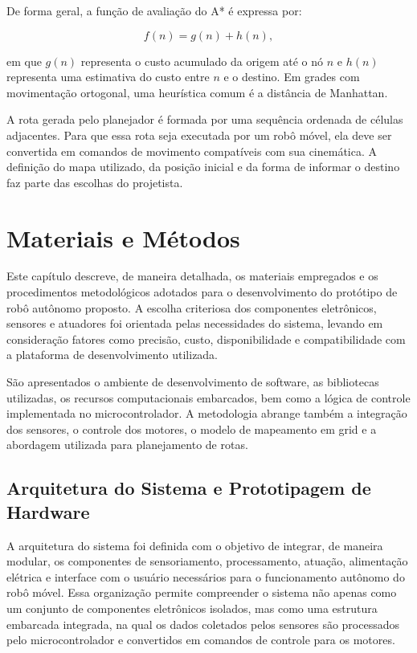 \documentclass[	12pt, Times, openright, twoside, a4paper, english, brazil]{abntex2}
\begin{document}
De forma geral, a função de avaliação do A* é expressa por:

\begin{equation}
		f(n) = g(n) + h(n),
\end{equation}

\noindent em que \(g(n)\) representa o custo acumulado da origem até o nó \(n\) e \(h(n)\) representa uma estimativa do custo entre \(n\) e o destino. Em grades com movimentação ortogonal, uma heurística comum é a distância de Manhattan.

A rota gerada pelo planejador é formada por uma sequência ordenada de células adjacentes. Para que essa rota seja executada por um robô móvel, ela deve ser convertida em comandos de movimento compatíveis com sua cinemática. A definição do mapa utilizado, da posição inicial e da forma de informar o destino faz parte das escolhas do projetista.

\chapter{Materiais e Métodos}
\label{cap:materiais_metodos}

Este capítulo descreve, de maneira detalhada, os materiais empregados e os procedimentos metodológicos adotados para o desenvolvimento do protótipo de robô autônomo proposto. A escolha criteriosa dos componentes eletrônicos, sensores e atuadores foi orientada pelas necessidades do sistema, levando em consideração fatores como precisão, custo, disponibilidade e compatibilidade com a plataforma de desenvolvimento utilizada.

São apresentados o ambiente de desenvolvimento de software, as bibliotecas utilizadas, os recursos computacionais embarcados, bem como a lógica de controle implementada no microcontrolador. A metodologia abrange também a integração dos sensores, o controle dos motores, o modelo de mapeamento em grid e a abordagem utilizada para planejamento de rotas.

\section{Arquitetura do Sistema e Prototipagem de Hardware}
\label{sec:arquitetura_sistema}

A arquitetura do sistema foi definida com o objetivo de integrar, de maneira modular, os componentes de sensoriamento, processamento, atuação, alimentação elétrica e interface com o usuário necessários para o funcionamento autônomo do robô móvel. Essa organização permite compreender o sistema não apenas como um conjunto de componentes eletrônicos isolados, mas como uma estrutura embarcada integrada, na qual os dados coletados pelos sensores são processados pelo microcontrolador e convertidos em comandos de controle para os motores.
\end{document}
